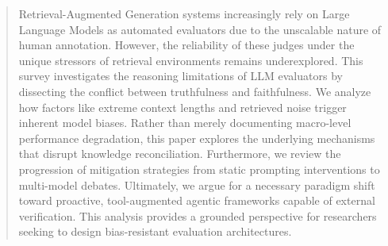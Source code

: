 \begin{abstract}

Retrieval-Augmented Generation systems increasingly rely on Large Language Models as automated evaluators due to the unscalable nature of human annotation. However, the reliability of these judges under the unique stressors of retrieval environments remains underexplored. This survey investigates the reasoning limitations of LLM evaluators by dissecting the conflict between truthfulness and faithfulness. We analyze how factors like extreme context lengths and retrieved noise trigger inherent model biases. Rather than merely documenting macro-level performance degradation, this paper explores the underlying mechanisms that disrupt knowledge reconciliation. Furthermore, we review the progression of mitigation strategies from static prompting interventions to multi-model debates. Ultimately, we argue for a necessary paradigm shift toward proactive, tool-augmented agentic frameworks capable of external verification. This analysis provides a grounded perspective for researchers seeking to design bias-resistant evaluation architectures.
\end{abstract}
